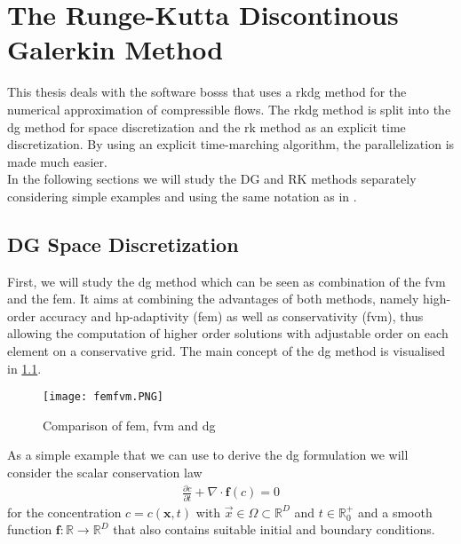 \chapter{The Runge-Kutta Discontinous Galerkin Method}
	This thesis deals with the software \gls{bosss} that uses a \gls{rkdg} method for the numerical approximation of compressible flows. The \gls{rkdg} method is split into the \gls{dg} method for space discretization and the \gls{rk} method as an explicit time discretization. By using an explicit time-marching algorithm, the parallelization is made much easier. \\ \indent
	In the following sections we will study the DG and RK methods separately considering simple examples and using the same notation as in \cite{mueller2014}.
	\section{DG Space Discretization}
		First, we will study the \gls{dg} method which can be seen as combination of the \gls{fvm} and the \gls{fem}. It aims at combining the advantages of both methods, namely high-order accuracy and hp-adaptivity (\gls{fem}) as well as conservativity (\gls{fvm}), thus allowing the computation of higher order solutions with adjustable order on each element on a conservative grid. The main concept of the \gls{dg} method is visualised in \ref{femfvm}.
		
		\begin{figure}[htp]
			\centering
			\texttt{[image: femfvm.PNG]}
			\caption{Comparison of \gls{fem}, \gls{fvm} and \gls{dg} }
			\label{femfvm}
		\end{figure} 

		As a simple example that we can use to derive the \gls{dg} formulation we will consider the scalar conservation law 	
		\begin{align}
			\frac{\partial c}{\partial t} + \nabla \cdot \boldsymbol{f}(c) = 0
			\label{pde}
		\end{align}	
		for the concentration $c = c(\boldsymbol{x}, t)$  with $\vec{x} \in \Omega \subset \mathbb{R}^D$ and $t\in \mathbb{R}_0^+$ and a smooth function $\boldsymbol{f}:\mathbb{R} \rightarrow \mathbb{R}^D$ that also contains suitable initial and boundary conditions.\cite{mueller2014} 
